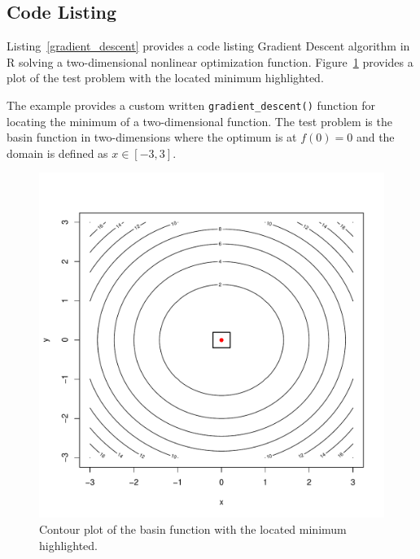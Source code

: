 \subsection{Code Listing}
Listing~\ref{gradient_descent} provides a code listing Gradient Descent algorithm in R solving a two-dimensional nonlinear optimization function. Figure~\ref{plot:gradient_descent_result} provides a plot of the test problem with the located minimum highlighted.

The example provides a custom written \texttt{gradient\_descent()} function for locating the minimum of a two-dimensional function.
The test problem is the basin function in two-dimensions where the optimum is at $f(0)=0$ and the domain is defined as $x \in [-3,3]$. 



\begin{figure}[htp]
\centering
\includegraphics[scale=0.45]{a_optimization/gradient_descent_result.pdf}
\caption{Contour plot of the basin function with the located minimum highlighted.}
\label{plot:gradient_descent_result}
\end{figure}

